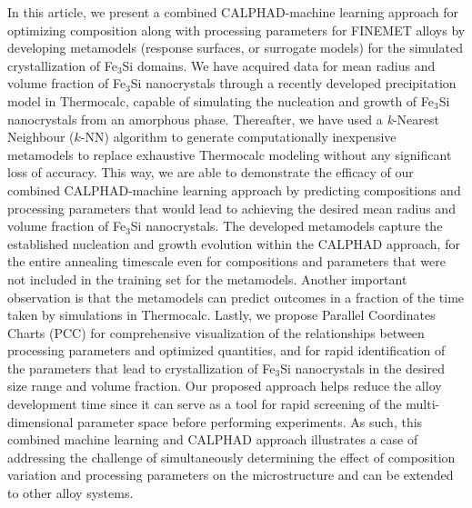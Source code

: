 In this article, we present a combined CALPHAD-machine learning approach for optimizing composition along with processing parameters
for FINEMET alloys by developing metamodels (response surfaces, or surrogate models) for the simulated crystallization of
Fe$_3$Si domains.
We have acquired data for mean radius and volume fraction of Fe$_3$Si nanocrystals through a recently developed
precipitation model\cite{jha2017FINEMET_CALPHAD} in Thermocalc,\cite{THERMOCALC} capable
of simulating the nucleation and growth of Fe$_3$Si nanocrystals from an amorphous phase.
Thereafter, we have used a \emph{k}-Nearest
Neighbour ($k$-NN) algorithm to generate computationally inexpensive metamodels to replace exhaustive Thermocalc modeling without any significant loss of accuracy. This way, we are able to demonstrate the efficacy of our combined CALPHAD-machine learning approach by predicting compositions and processing parameters that would lead to achieving the desired mean radius and volume fraction of Fe$_3$Si nanocrystals.
The developed metamodels capture the established nucleation and growth evolution\cite{kampmann1984decomposition, wagner1991homogeneous} within the CALPHAD approach, for the entire annealing timescale even for compositions and parameters that were not included in the training set for the metamodels. Another important observation is that the metamodels can predict outcomes in a fraction of the time taken by simulations in Thermocalc.\cite{THERMOCALC_TCFE8} Lastly, we propose Parallel Coordinates Charts (PCC)\cite{PCC}  for comprehensive visualization of the relationships between processing parameters and optimized quantities, and for  rapid identification of the parameters that lead to crystallization of Fe$_3$Si nanocrystals in the desired size  range and volume fraction. Our proposed approach helps reduce the alloy development time since it can serve as a tool for rapid screening of the multi-dimensional parameter space before performing experiments. As such, this combined machine learning and CALPHAD approach illustrates a case of addressing the challenge of simultaneously determining the effect of composition variation and processing parameters\cite{1_PSP_Kalidindi, 2_PSP_Kalidindi, 3_PSP_Kalidindi, PSP_APL, PSP_Challenges_Kalidindi} on the microstructure and can be extended to other alloy systems.


